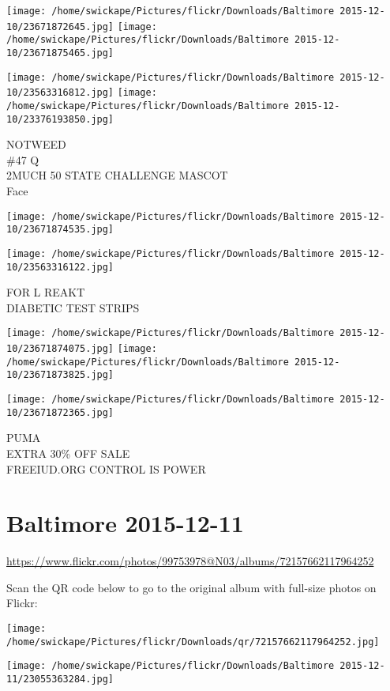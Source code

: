 \documentclass[10pt,letterpaper]{article}
\begin{document}
\texttt{[image: /home/swickape/Pictures/flickr/Downloads/Baltimore 2015-12-10/23671872645.jpg]}
\texttt{[image: /home/swickape/Pictures/flickr/Downloads/Baltimore 2015-12-10/23671875465.jpg]}

\texttt{[image: /home/swickape/Pictures/flickr/Downloads/Baltimore 2015-12-10/23563316812.jpg]}
\texttt{[image: /home/swickape/Pictures/flickr/Downloads/Baltimore 2015-12-10/23376193850.jpg]}

NOTWEED\\
\#47 Q\\
2MUCH 50 STATE CHALLENGE MASCOT\\
Face
\pagebreak

\texttt{[image: /home/swickape/Pictures/flickr/Downloads/Baltimore 2015-12-10/23671874535.jpg]}

\vspace{0.25in}
\texttt{[image: /home/swickape/Pictures/flickr/Downloads/Baltimore 2015-12-10/23563316122.jpg]}

FOR L REAKT\\
DIABETIC TEST STRIPS
\pagebreak

\texttt{[image: /home/swickape/Pictures/flickr/Downloads/Baltimore 2015-12-10/23671874075.jpg]}
\texttt{[image: /home/swickape/Pictures/flickr/Downloads/Baltimore 2015-12-10/23671873825.jpg]}

\texttt{[image: /home/swickape/Pictures/flickr/Downloads/Baltimore 2015-12-10/23671872365.jpg]}

PUMA\\
EXTRA 30\% OFF SALE\\
FREEIUD.ORG CONTROL IS POWER
\pagebreak

\section*{Baltimore 2015-12-11}

\url{https://www.flickr.com/photos/99753978@N03/albums/72157662117964252}

Scan the QR code below to go to the original album with full-size photos on Flickr:

\texttt{[image: /home/swickape/Pictures/flickr/Downloads/qr/72157662117964252.jpg]}
\pagebreak

\texttt{[image: /home/swickape/Pictures/flickr/Downloads/Baltimore 2015-12-11/23055363284.jpg]}
\end{document}
